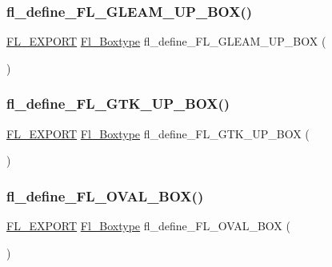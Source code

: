 \subsubsection{\texorpdfstring{fl\+\_\+define\+\_\+\+F\+L\+\_\+\+G\+L\+E\+A\+M\+\_\+\+U\+P\+\_\+\+B\+O\+X()}{fl\_define\_FL\_GLEAM\_UP\_BOX()}}
{\footnotesize\ttfamily \hyperlink{_fl___export_8_h_aa9ba29a18aee9d738370a06eeb4470fc}{F\+L\+\_\+\+E\+X\+P\+O\+RT} \hyperlink{_enumerations_8_h_ae48bf9070f8541de17829f54ccacc6bc}{Fl\+\_\+\+Boxtype} fl\+\_\+define\+\_\+\+F\+L\+\_\+\+G\+L\+E\+A\+M\+\_\+\+U\+P\+\_\+\+B\+OX (\begin{DoxyParamCaption}{ }\end{DoxyParamCaption})}

\mbox{\label{_enumerations_8_h_acddcd32d55f441d62bee63ce326d5f2c}} 
\subsubsection{\texorpdfstring{fl\+\_\+define\+\_\+\+F\+L\+\_\+\+G\+T\+K\+\_\+\+U\+P\+\_\+\+B\+O\+X()}{fl\_define\_FL\_GTK\_UP\_BOX()}}
{\footnotesize\ttfamily \hyperlink{_fl___export_8_h_aa9ba29a18aee9d738370a06eeb4470fc}{F\+L\+\_\+\+E\+X\+P\+O\+RT} \hyperlink{_enumerations_8_h_ae48bf9070f8541de17829f54ccacc6bc}{Fl\+\_\+\+Boxtype} fl\+\_\+define\+\_\+\+F\+L\+\_\+\+G\+T\+K\+\_\+\+U\+P\+\_\+\+B\+OX (\begin{DoxyParamCaption}{ }\end{DoxyParamCaption})}

\mbox{\label{_enumerations_8_h_a36d20b2fd40d9665512ee16fe89670db}} 
\subsubsection{\texorpdfstring{fl\+\_\+define\+\_\+\+F\+L\+\_\+\+O\+V\+A\+L\+\_\+\+B\+O\+X()}{fl\_define\_FL\_OVAL\_BOX()}}
{\footnotesize\ttfamily \hyperlink{_fl___export_8_h_aa9ba29a18aee9d738370a06eeb4470fc}{F\+L\+\_\+\+E\+X\+P\+O\+RT} \hyperlink{_enumerations_8_h_ae48bf9070f8541de17829f54ccacc6bc}{Fl\+\_\+\+Boxtype} fl\+\_\+define\+\_\+\+F\+L\+\_\+\+O\+V\+A\+L\+\_\+\+B\+OX (\begin{DoxyParamCaption}{ }\end{DoxyParamCaption})}

